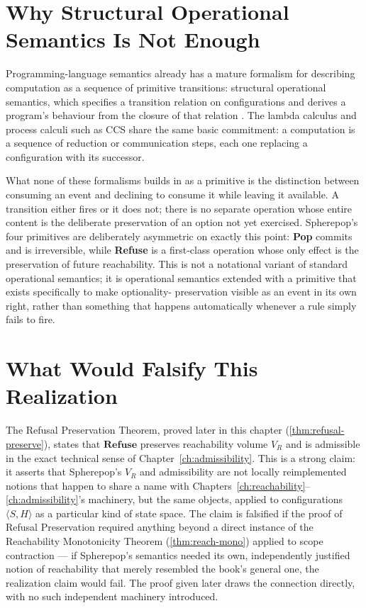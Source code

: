 \documentclass[12pt,twoside,openright]{book}
\newcounter{exercise}[chapter]
\begin{document}
\section{Why Structural Operational Semantics Is Not Enough}
\label{sec:ch24-why-sos}

Programming-language semantics already has a mature
formalism for describing computation as a sequence of
primitive transitions: structural operational semantics,
which specifies a transition relation on configurations and
derives a program's behaviour from the closure of that
relation \parencite{plotkin1981}. The lambda calculus
\parencite{church1936} and process calculi such as CCS
\parencite{milner1989} share the same basic commitment: a
computation is a sequence of reduction or communication steps,
each one replacing a configuration with its successor.

What none of these formalisms builds in as a primitive is the
distinction between consuming an event and declining to
consume it while leaving it available. A transition either
fires or it does not; there is no separate operation whose
entire content is the deliberate preservation of an option not
yet exercised. Spherepop's four primitives are deliberately
asymmetric on exactly this point: \textbf{Pop} commits and is
irreversible, while \textbf{Refuse} is a first-class operation
whose only effect is the preservation of future reachability.
This is not a notational variant of standard operational
semantics; it is operational semantics extended with a
primitive that exists specifically to make optionality-
preservation visible as an event in its own right, rather than
something that happens automatically whenever a rule simply
fails to fire.

\section{What Would Falsify This Realization}
\label{sec:ch24-falsifiability}

The Refusal Preservation Theorem, proved later in this
chapter (\cref{thm:refusal-preserve}), states that
$\mathbf{Refuse}$ preserves reachability volume $V_R$ and is
admissible in the exact technical sense of
Chapter~\ref{ch:admissibility}. This is a strong claim: it
asserts that Spherepop's $V_R$ and admissibility are not
locally reimplemented notions that happen to share a name with
Chapters~\ref{ch:reachability}--\ref{ch:admissibility}'s
machinery, but the same objects, applied to configurations
$\langle S, H\rangle$ as a particular kind of state space. The
claim is falsified if the proof of Refusal Preservation
required anything beyond a direct instance of the Reachability
Monotonicity Theorem (\cref{thm:reach-mono}) applied to scope
contraction --- if Spherepop's semantics needed its own,
independently justified notion of reachability that merely
resembled the book's general one, the realization claim would
fail. The proof given later draws the connection directly, with
no such independent machinery introduced.
\end{document}
